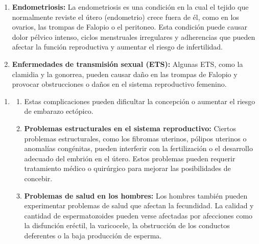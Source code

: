 \documentclass[8pt,a4paper]{beamer}
\begin{document}
{\begin{frame}{}
\begin{block}{}
\begin{enumerate}
\begin{enumerate}
\item[\ding{65}] \textbf{Endometriosis:} La endometriosis es una condición en la cual el tejido que normalmente reviste el útero (endometrio) crece fuera de él, como en los ovarios, las trompas de Falopio o el peritoneo. Esta condición puede causar dolor pélvico intenso, ciclos menstruales irregulares y adherencias que pueden afectar la función reproductiva y aumentar el riesgo de infertilidad.

\item[\ding{65}] \textbf{Enfermedades de transmisión sexual (ETS):} Algunas ETS, como la clamidia y la gonorrea, pueden causar daño en las trompas de Falopio y provocar obstrucciones o daños en el sistema reproductivo femenino. 
\end{enumerate}
\end{enumerate}
\end{block}
\end{frame}


\begin{frame}{}
\begin{block}{}
\setlength{\parskip}{3px}
\justifying
\begin{enumerate}
\setlength{\parskip}{3px}
\justifying
\item[{}] 
\begin{enumerate}
\setlength{\parskip}{3px}
\justifying
\item[{}] Estas complicaciones pueden dificultar la concepción o aumentar el riesgo de embarazo ectópico.

\item[\ding{65}] \textbf{Problemas estructurales en el sistema reproductivo:} Ciertos problemas estructurales, como los fibromas uterinos, pólipos uterinos o anomalías congénitas, pueden interferir con la fertilización o el desarrollo adecuado del embrión en el útero. Estos problemas pueden requerir tratamiento médico o quirúrgico para mejorar las posibilidades de concebir.

\item[\ding{65}] \textbf{Problemas de salud en los hombres:} Los hombres también pueden experimentar problemas de salud que afectan la fecundidad. La calidad y cantidad de espermatozoides pueden verse afectadas por afecciones como la disfunción eréctil, la varicocele, la obstrucción de los conductos deferentes o la baja producción de esperma.


\end{enumerate}
\end{enumerate}
\end{block}
\end{frame}}
\end{document}
